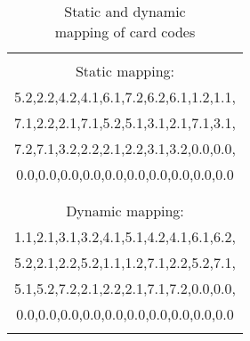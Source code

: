 \begin{minipage}{0.5\textwidth}
	
	\begin{table}[H]
		\centering
		
		\begin{tabular}{|c|}
			\hline
			\\
			Static mapping:  \\
			5.2,2.2,4.2,4.1,6.1,7.2,6.2,6.1,1.2,1.1,\\
			7.1,2.2,2.1,7.1,5.2,5.1,3.1,2.1,7.1,3.1,\\
			7.2,7.1,3.2,2.2,2.1,2.2,3.1,3.2,0.0,0.0,\\
			0.0,0.0,0.0,0.0,0.0,0.0,0.0,0.0,0.0,0.0 \\
			\\
			\hline
			\\
			Dynamic mapping: \\
			1.1,2.1,3.1,3.2,4.1,5.1,4.2,4.1,6.1,6.2,\\
			5.2,2.1,2.2,5.2,1.1,1.2,7.1,2.2,5.2,7.1,\\
			5.1,5.2,7.2,2.1,2.2,2.1,7.1,7.2,0.0,0.0,\\
			0.0,0.0,0.0,0.0,0.0,0.0,0.0,0.0,0.0,0.0 \\
			\\
			\hline
		\end{tabular}
		\caption[Static and dynamic mapping of card codes.]{Static and dynamic\\\hspace{0\textwidth}mapping of card codes}
		\label{tab:mappings}
	\end{table}
	
		
		
\end{minipage}


